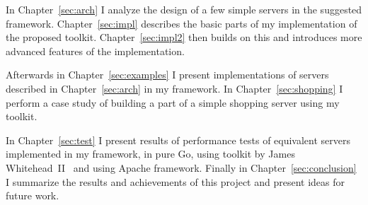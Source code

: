 In Chapter~\ref{sec:arch} I analyze the design of a few simple servers
in the suggested framework. Chapter~\ref{sec:impl} describes the basic parts of 
my implementation of the proposed toolkit. Chapter~\ref{sec:impl2} then builds
on this and introduces more advanced features of the implementation.

Afterwards in Chapter~\ref{sec:examples} I present
implementations of servers described in Chapter~\ref{sec:arch} in my framework.
In Chapter~\ref{sec:shopping} I perform a case study of building
a part of a simple shopping server using my toolkit.

In Chapter~\ref{sec:test} I present results of performance tests of equivalent 
servers implemented in my framework, in pure Go, using toolkit by 
James Whitehead~II~\cite{whitehead} and using Apache framework. 
Finally in Chapter~\ref{sec:conclusion} I summarize the results and 
achievements of this project and present ideas for future work.